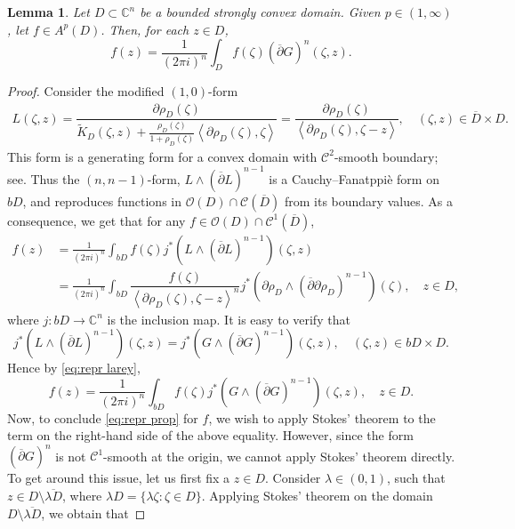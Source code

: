 \documentclass[11pt, oneside, reqno]{amsart}
\numberwithin{equation}{section}
\newtheorem{lemma}[theorem]{Lemma}
\theoremstyle{definition}
\newcommand{\beas}{\begin{eqnarray*}}
\newcommand{\eeas}{\end{eqnarray*}}
\newcommand{\be} {\begin{equation}}
\newcommand{\ee} {\end{equation}}
\newcommand{\hol}{\mathcal {O}}
\newcommand{\cont}{\mathcal C}
\newcommand{\C}{\mathbb C}
\newcommand{\Cn}{{\mathbb{C}^n}}
\newcommand{\ltt}{\left(}
\newcommand{\rtt}{\right)}
\begin{document}
{    \begin{lemma}\label{le:repr}
   Let $D\subset\Cn$ be a bounded strongly convex domain. Given $p\in(1,\infty)$, let $f\in A^p\ltt D\rtt$. Then, for each $z\in D$, 
    \be\label{eq:repr prop}
    f(z)=\frac{1}{(2\pi i)^n}\int_D f(\zeta)\ltt\overline{\partial}G\rtt^n\ltt\zeta,z\rtt.
    \ee
    \end{lemma}
    \begin{proof}
      Consider the modified $(1,0)$-form 
        \beas
L\ltt\zeta,z\rtt=\dfrac{\partial\rho_D(\zeta)}{\widetilde{K}_D\ltt\zeta,z\rtt+\frac{\rho_D(\zeta)}{1+\rho_D(\zeta)}\left\langle\partial\rho_D(\zeta),\zeta\right\rangle}=\dfrac{\partial\rho_D(\zeta)}{\left\langle\partial\rho_D(\zeta),\zeta-z\right\rangle},\quad \ltt\zeta,z\rtt\in\overline{D}\times D.
        \eeas
This form is a generating form for a convex domain with $\cont^2$-smooth boundary; see\cite[\S 3]{Ra98}. Thus the $(n,n-1)$-form, $L\wedge\ltt\overline\partial L\rtt^{n-1}$ is a Cauchy--Fanatppi{\`e} form on $bD$, and reproduces functions in $\hol\ltt D\rtt\cap\cont\ltt\overline D\rtt$ from its boundary values. As a consequence, we get that for any $f\in\hol\ltt D\rtt\cap\cont^1\ltt\overline{D}\rtt$, 
\begin{align}\label{eq:repr larey}\nonumber
f(z)&=\frac{1}{(2\pi i)^n}\int_{bD} f(\zeta)j^*\ltt L\wedge\ltt\overline\partial L\rtt^{n-1}\rtt(\zeta,z)\\
&=\frac{1}{(2\pi i)^n}\int_{bD} \dfrac{f(\zeta)}{\left\langle\partial\rho_D(\zeta),\zeta-z\right\rangle^n} j^*\ltt\partial \rho_D\wedge\ltt\overline{\partial}\partial\rho_D\rtt^{n-1}\rtt(\zeta), \quad z\in D,
\end{align}
where $j:bD\rightarrow\C^n$ is the inclusion map. It is easy to verify that
\[
j^*\ltt L\wedge\ltt\overline\partial L\rtt^{n-1}\rtt(\zeta,z)=j^*\ltt G\wedge\ltt\overline\partial G\rtt^{n-1}\rtt(\zeta,z),\quad \ltt\zeta,z\rtt\in bD\times D.
\]
Hence by \eqref{eq:repr larey},
\be\label{eq:repr bdry our}
f(z)=\frac{1}{(2\pi i)^n}\int_{bD} f(\zeta)j^*\ltt G\wedge\ltt\overline\partial G\rtt^{n-1}\rtt(\zeta,z),\quad z\in D.
\ee
 Now, to conclude \eqref{eq:repr prop} for $f$, we wish to apply Stokes' theorem to the term on the right-hand side of the above equality. However, since the form $\ltt \overline \partial G\rtt^{n}$ is not $\cont^1$-smooth at the origin, we cannot apply Stokes' theorem directly. To get around this issue, let us first fix a $z\in D$. Consider $\lambda\in(0,1)$, such that $z\in  D\setminus \overline{\lambda D}$, where $\lambda D=\{\lambda\zeta:\zeta\in D\}$. Applying Stokes' theorem on the domain $ D\setminus \overline{\lambda D}$, we obtain that

\end{proof}}
\end{document}
